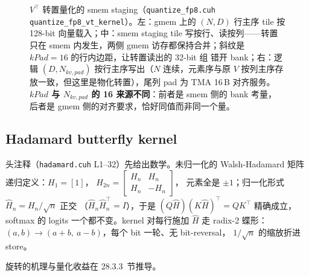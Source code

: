 \begin{figure}[H]
\caption{$V^{\top}$ 转置量化的 smem staging（\texttt{quantize\_fp8.cuh}
\texttt{quantize\_fp8\_vt\_kernel}）。左：gmem 上的 $(N,D)$ 行主序 tile 按 128-bit
向量载入；中：smem staging tile 写按行、读按列——转置只在 smem 内发生，两侧
gmem 访存都保持合并；斜纹是 $kPad{=}16$ 的行内边距，让转置读出的 32-bit 组
错开 bank；右：逻辑 $(D,N_{kv,pad})$ 按行主序写出（$N$ 连续，元素序与原 $V$
按列主序存放一致，但这里是物化转置），尾列 pad 为 TMA 16\,B 对齐服务。
\textbf{$kPad$ 与 $N_{kv,pad}$ 的 16 来源不同}：前者是 smem 侧的 bank 考量，
后者是 gmem 侧的对齐要求，恰好同值而非同一个量。}
\label{fig:28-vt-staging}
\end{figure}

\subsection{Hadamard butterfly kernel}\label{sec:28-wht-kernel}

头注释（\texttt{hadamard.cuh} L1--32）先给出数学。未归一化的 Walsh-Hadamard
矩阵递归定义：$H_1=[1]$，
$H_{2n}=\left[\begin{smallmatrix} H_n & H_n\\ H_n & -H_n\end{smallmatrix}\right]$，
元素全是 $\pm1$；归一化形式 $\hat H_n = H_n/\sqrt{n}$ 正交
（$\hat H_n\hat H_n^{\top}=I$），于是 $(Q\hat H)(K\hat H)^{\top}=QK^{\top}$
精确成立，softmax 的 logits 一个都不变。kernel 对每行施加 $\hat H$ 走
radix-2 蝶形：$(a,b)\to(a{+}b,\ a{-}b)$，每个 bit 一轮、无 bit-reversal，
$1/\sqrt{n}$ 的缩放折进 store。

旋转的机理与量化收益在 28.3.3~节推导。

